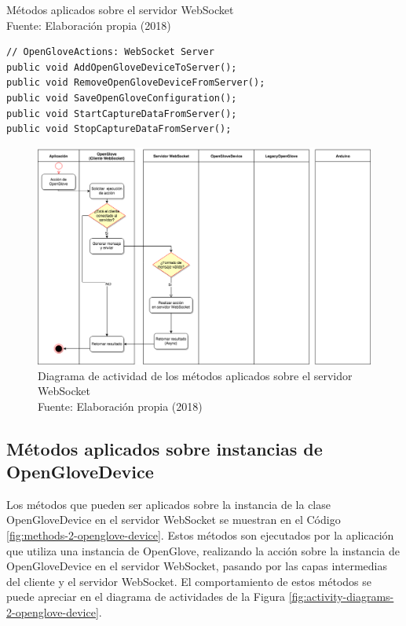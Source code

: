 \begin{algorithm}[!ht]
  \begin{center} 
   \captionsetup{justification=centering}
    \caption[Métodos aplicados sobre el servidor WebSocket]{Métodos aplicados sobre el servidor WebSocket \\ \tab[4cm] Fuente: Elaboración propia (2018)}
    \label{fig:methods-1-websocket-server}
  \end{center}
\begin{lstlisting}
// OpenGloveActions: WebSocket Server
public void AddOpenGloveDeviceToServer();
public void RemoveOpenGloveDeviceFromServer();
public void SaveOpenGloveConfiguration();
public void StartCaptureDataFromServer();
public void StopCaptureDataFromServer();
\end{lstlisting}
\end{algorithm}


\begin{figure}[H]
  \begin{center} 
   	\includegraphics[width=1.0\textwidth]{images/chapter04/ActivityDiagrams-OpenGloveActions-1.png} 
   	\captionsetup{justification=centering}
    \caption[Diagrama de actividad de los métodos aplicados sobre el servidor WebSocket]{Diagrama de actividad de los métodos aplicados sobre el servidor WebSocket\\Fuente: Elaboración propia (2018)}
    \label{fig:activity-diagrams-1-websocket-server}
  \end{center}
\end{figure}





\subsection{Métodos aplicados sobre instancias de OpenGloveDevice}
\label{subsection:method-openglove-device}
Los métodos que pueden ser aplicados sobre la instancia de la clase OpenGloveDevice en el servidor WebSocket se muestran en el Código \ref{fig:methods-2-openglove-device}. Estos métodos son ejecutados por la aplicación que utiliza una instancia de OpenGlove, realizando la acción sobre la instancia de OpenGloveDevice en el servidor WebSocket, pasando por las capas intermedias del cliente y el servidor WebSocket. El comportamiento de estos métodos se puede apreciar en el diagrama de actividades de la Figura \ref{fig:activity-diagrams-2-openglove-device}.


